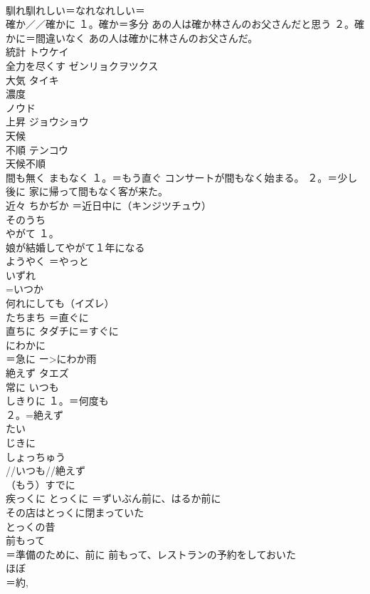 \documentclass[8pt]{extreport}
\begin{document}
\begin{CJK}{UTF8}{min}
\\	馴れ馴れしい＝なれなれしい＝
\\	確か／／確かに	１。確か＝多分 あの人は確か林さんのお父さんだと思う ２。確かに＝間違いなく あの人は確かに林さんのお父さんだ。
\\	統計	トウケイ 
\\	全力を尽くす	ゼンリョクヲツクス 
\\	大気	タイキ 
\\	濃度	
\\	ノウド
\\	上昇	ジョウショウ 
\\	天候 
\\	不順	テンコウ 
\\	天候不順 
\\	間も無く	まもなく １。＝もう直ぐ コンサートが間もなく始まる。 ２。＝少し後に 家に帰って間もなく客が来た。
\\	近々	ちかぢか ＝近日中に（キンジツチュウ） 
\\	そのうち	
\\	やがて	１。
\\	娘が結婚してやがて１年になる
\\	ようやく	＝やっと 
\\	いずれ	
\\	=いつか 
\\	何れにしても（イズレ）
\\	たちまち	＝直ぐに 
\\	直ちに	タダチに＝すぐに 
\\	にわかに	
\\	＝急に ー>にわか雨 
\\	絶えず	タエズ 
\\	常に	いつも 
\\	しきりに	１。＝何度も 
\\	２。=絶えず 
\\	たい 
\\	じきに 
\\	しょっちゅう	
\\	//いつも//絶えず
\\	（もう）すでに	
\\	疾っくに	とっくに ＝ずいぶん前に、はるか前に 
\\	その店はとっくに閉まっていた 
\\	とっくの昔 
\\	前もって	
\\	＝準備のために、前に 前もって、レストランの予約をしておいた
\\	ほぼ	
\\	＝約, 

\end{CJK}
\end{document}
